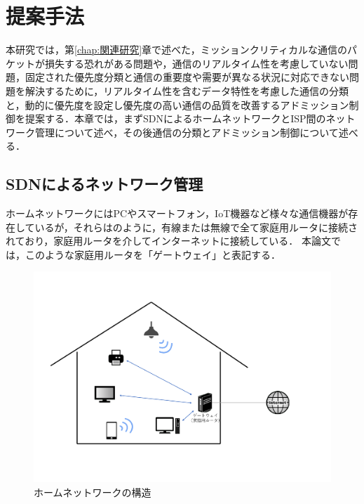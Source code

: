 \documentclass[a4paper,11pt,uplatex]{ujreport}
\begin{document}
\chapter{提案手法}
\label{chap:提案手法}

  本研究では，第\ref{chap:関連研究}章で述べた，ミッションクリティカルな通信のパケットが損失する恐れがある問題や，通信のリアルタイム性を考慮していない問題，固定された優先度分類と通信の重要度や需要が異なる状況に対応できない問題を解決するために，リアルタイム性を含むデータ特性を考慮した通信の分類と，動的に優先度を設定し優先度の高い通信の品質を改善するアドミッション制御を提案する．本章では，まずSDNによるホームネットワークとISP間のネットワーク管理について述べ，その後通信の分類とアドミッション制御について述べる．

\section{SDNによるネットワーク管理}
\label{sec:SDNによるネットワーク管理}

  ホームネットワークにはPCやスマートフォン，IoT機器など様々な通信機器が存在しているが，それらはのように，有線または無線で全て家庭用ルータに接続されており，家庭用ルータを介してインターネットに接続している．
  本論文では，このような家庭用ルータを「ゲートウェイ」と表記する．

  \begin{figure}[!b]
    \centering
    \includegraphics[width=\linewidth]{img/homenetwork_trimmed.pdf}
    \caption{ホームネットワークの構造}
    \label{fig:homenetwork}
  \end{figure}
\end{document}
